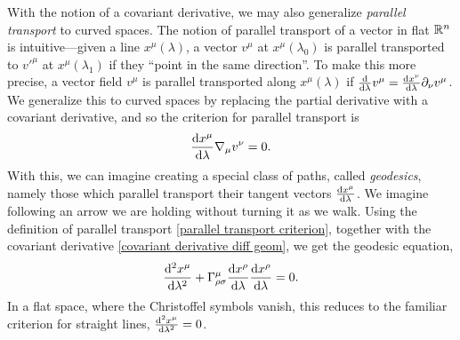 %
With the notion of a covariant derivative, we may also generalize \emph{parallel transport} to curved spaces.
The notion of parallel transport of a vector in flat $\mathbb{R}^n$ is intuitive---given a line $x^\mu(\lambda)$, a vector $v^\mu$ at $x^\mu(\lambda_0)$ is parallel transported to $v'^\mu$ at $x^\mu(\lambda_1)$ if they ``point in the same direction''.
To make this more precise, a vector field $v^\mu$ is parallel transported along $x^\mu(\lambda)$ if $\odv{}{\lambda} v^\mu = \odv{x^\nu}{\lambda} \partial_\nu v^\mu$.
We generalize this to curved spaces by replacing the partial derivative with a covariant derivative, and so the criterion for parallel transport is
%
\begin{equation}
    \label{parallel transport criterion}
    \odv{x^\mu}{\lambda} \nabla_\mu v^\nu = 0.
\end{equation}
%
With this, we can imagine creating a special class of paths, called \emph{geodesics}, namely those which parallel transport their tangent vectors $\odv{x^\mu}{\lambda}$.
We imagine following an arrow we are holding without turning it as we walk.
Using the definition of parallel transport \autoref{parallel transport criterion}, together with the covariant derivative \autoref{covariant derivative diff geom}, we get the geodesic equation,
%
\begin{equation}
    \odv[2]{x^\mu}{\lambda} 
    + \Gamma^\mu_{\rho \sigma} \odv{x^\rho}{\lambda} \odv{x^\rho}{\lambda}
    = 0.
\end{equation}
In a flat space, where the Christoffel symbols vanish, this reduces to the familiar criterion for straight lines, $\odv[2]{x^\mu}{\lambda} = 0$.

